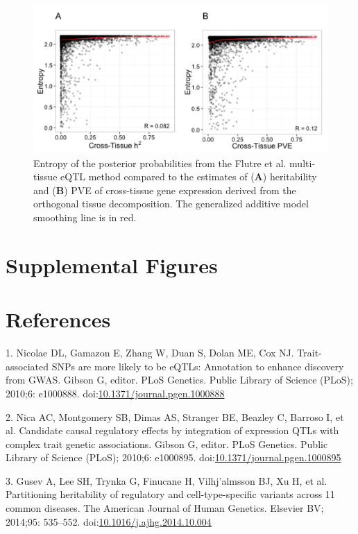 \documentclass[]{article}
\begin{document}
\begin{figure}[htbp]
\centering
\includegraphics{GenArch_manuscript_files/figure-latex/entropyCT-1.pdf}
\caption{Entropy of the posterior probabilities from the Flutre et al.
multi-tissue eQTL method compared to the estimates of (\textbf{A})
heritability and (\textbf{B}) PVE of cross-tissue gene expression
derived from the orthogonal tissue decomposition. The generalized
additive model smoothing line is in red.}
\end{figure}

\section{Supplemental Figures}\label{supplemental-figures}

\section*{References}\label{references}

1. Nicolae DL, Gamazon E, Zhang W, Duan S, Dolan ME, Cox NJ.
Trait-associated SNPs are more likely to be eQTLs: Annotation to enhance
discovery from GWAS. Gibson G, editor. PLoS Genetics. Public Library of
Science (PLoS); 2010;6: e1000888.
doi:\href{http://dx.doi.org/10.1371/journal.pgen.1000888}{10.1371/journal.pgen.1000888}

2. Nica AC, Montgomery SB, Dimas AS, Stranger BE, Beazley C, Barroso I,
et al. Candidate causal regulatory effects by integration of expression
QTLs with complex trait genetic associations. Gibson G, editor. PLoS
Genetics. Public Library of Science (PLoS); 2010;6: e1000895.
doi:\href{http://dx.doi.org/10.1371/journal.pgen.1000895}{10.1371/journal.pgen.1000895}

3. Gusev A, Lee SH, Trynka G, Finucane H, Vilhj{\a'a}lmsson BJ, Xu H, et
al. Partitioning heritability of regulatory and cell-type-specific
variants across 11 common diseases. The American Journal of Human
Genetics. Elsevier BV; 2014;95: 535--552.
doi:\href{http://dx.doi.org/10.1016/j.ajhg.2014.10.004}{10.1016/j.ajhg.2014.10.004}
\end{document}
